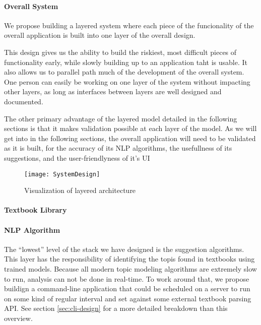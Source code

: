 \paragraph{Overall System}
We propose building a layered system where each piece of the
funcionality of the overall application is built into one layer of the
overall design.

This design gives us the ability to build the riskiest, most difficult
pieces of functionality early, while slowly building up to an
application taht is usable.
It also allows us to parallel path much of the development of the
overall system.
One person can easily be working on one layer of the system without
impacting other layers, as long as interfaces between layers are well
designed and documented.

The other primary advantage of the layered model detailed in the
following sections is that it makes validation possible at each layer
of the model.
As we will get into in the following sections, the overall application
will need to be validated as it is built, for the accuracy of its NLP
algorithms, the usefullness of its suggestions, and the
user-friendlyness of it's UI


\begin{figure*}[h]
\label{solution:mockup_search}
\caption{Visualization of layered architecture}
\centering
\texttt{[image: SystemDesign]}
\end{figure*}

\paragraph{Textbook Library}

\paragraph{NLP Algorithm}
The ``lowest'' level of the stack we have designed is the suggestion
algorithms.
This layer has the responsibility of identifying the topis found in
textbooks using trained models.
Because all modern topic modeling algorithms are extremely slow to
run, analysis can not be done in real-time.
To work around that, we propose buildign a command-line application
that could be scheduled on a server to run on some kind of regular
interval and set against some external textbook parsing API.  
See section \ref{sec:cli-design} for a more detailed breakdown than
this overview.

